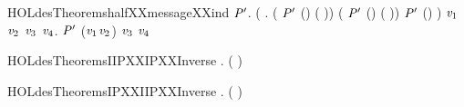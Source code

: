\begin{SaveVerbatim}{HOLdesTheoremshalfXXmessageXXind}
\HOLTokenTurnstile{} \HOLSymConst{\HOLTokenForall{}}\ensuremath{\HOLBoundVar{P}\sp{\prime{}}}.
     (\HOLSymConst{\HOLTokenForall{}}    .
        ( \HOLSymConst{\HOLTokenNotEqual{}}  \HOLSymConst{\HOLTokenConj{}}  \HOLSymConst{\HOLTokenNotEqual{}}  \HOLSymConst{\HOLTokenImp{}} \ensuremath{\HOLBoundVar{P}\sp{\prime{}}}  (\HOLSymConst{,})  ( \HOLSymConst{\ensuremath{-}} )) \HOLSymConst{\HOLTokenConj{}}
        ( \HOLSymConst{\HOLTokenNotEqual{}}  \HOLSymConst{\HOLTokenConj{}}  \HOLSymConst{\HOLTokenNotEqual{}}  \HOLSymConst{\HOLTokenImp{}} \ensuremath{\HOLBoundVar{P}\sp{\prime{}}}  (\HOLSymConst{,})  ( \HOLSymConst{\ensuremath{-}} )) \HOLSymConst{\HOLTokenImp{}}
        \ensuremath{\HOLBoundVar{P}\sp{\prime{}}}  (\HOLSymConst{,})  ) \HOLSymConst{\HOLTokenImp{}}
     \HOLSymConst{\HOLTokenForall{}} \ensuremath{\HOLBoundVar{v}\sb{\mathrm{1}}} \ensuremath{\HOLBoundVar{v}\sb{\mathrm{2}}} \ensuremath{\HOLBoundVar{v}\sb{\mathrm{3}}} \ensuremath{\HOLBoundVar{v}\sb{\mathrm{4}}}. \ensuremath{\HOLBoundVar{P}\sp{\prime{}}}  (\ensuremath{\HOLBoundVar{v}\sb{\mathrm{1}}}\HOLSymConst{,}\ensuremath{\HOLBoundVar{v}\sb{\mathrm{2}}}) \ensuremath{\HOLBoundVar{v}\sb{\mathrm{3}}} \ensuremath{\HOLBoundVar{v}\sb{\mathrm{4}}}
\end{SaveVerbatim}
\newcommand{\HOLdesTheoremshalfXXmessageXXind}{\UseVerbatim{HOLdesTheoremshalfXXmessageXXind}}
\begin{SaveVerbatim}{HOLdesTheoremsIIPXXIPXXInverse}
\HOLTokenTurnstile{} \HOLSymConst{\HOLTokenForall{}}.  ( ) \HOLSymConst{=} 
\end{SaveVerbatim}
\newcommand{\HOLdesTheoremsIIPXXIPXXInverse}{\UseVerbatim{HOLdesTheoremsIIPXXIPXXInverse}}
\begin{SaveVerbatim}{HOLdesTheoremsIPXXIIPXXInverse}
\HOLTokenTurnstile{} \HOLSymConst{\HOLTokenForall{}}.  ( ) \HOLSymConst{=} 
\end{SaveVerbatim}
